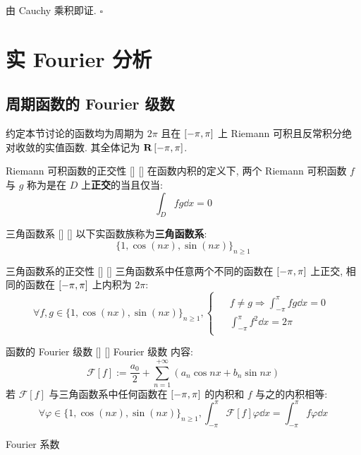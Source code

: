 \documentclass[UTF8]{ctexart}
\begin{document}
			\begin{prf}
				由 Cauchy 乘积即证. 
				\(\square\)
			\end{prf}

	\section{实 Fourier 分析}

		\subsection{周期函数的 Fourier 级数}

			约定本节讨论的函数均为周期为 \(2\pi\) 且在 \(\Icc{-\pi}{\pi}\) 上 Riemann 可积且反常积分绝对收敛的实值函数. 其全体记为 \(\mathbf{R}\Icc{-\pi}{\pi}\). 
			
			\begin{dfn}
			    []
			    {Riemann 可积函数的正交性}
			    []
			    []
				在函数内积的定义下, 两个 Riemann 可积函数 \(f\) 与 \(g\) 称为是在 \(D\) 上\textbf{正交}的当且仅当: 
				\[\int_D fg\dd x=0\]
			\end{dfn}

			\begin{dfn}
			    []
			    {三角函数系}
			    []
			    []
				以下实函数族称为\textbf{三角函数系}: 
				\[{\{1,\cos(nx),\sin(nx)\}}_{n\geq 1}\]
			\end{dfn}
			
			\begin{ppt}
			    []
			    {三角函数系的正交性}
			    []
			    []
				三角函数系中任意两个不同的函数在 \(\Icc{-\pi}{\pi}\) 上正交, 相同的函数在 \(\Icc{-\pi}{\pi}\) 上内积为 \(2\pi\): 
				\[\forall f,g\in{\{1,\cos(nx),\sin(nx)\}}_{n\geq 1}, 
				\begin{cases}
					\begin{aligned}
						&f\neq g \Longrightarrow\int_{-\pi}^{\pi}fg\dd x=0\\
						&\int_{-\pi}^{\pi}f^2\dd x=2\pi
					\end{aligned}
				\end{cases}\]
			\end{ppt}

			\begin{dfn}
			    []
			    {函数的 Fourier 级数}
			    []
			    []
			{}
			{Fourier 级数}
			{}
			{}
				内容: 
				\[\mathcal{F}[f]:=\frac{a_0}{2}+\sum_{n=1}^{+\infty}(a_n\cos nx+b_n\sin nx)\]
				若 \(\mathcal{F}[f]\) 与三角函数系中任何函数在 \(\Icc{-\pi}{\pi}\) 的内积和 \(f\) 与之的内积相等: 
				\[\forall\varphi\in{\{1,\cos(nx),\sin(nx)\}}_{n\geq 1}, \int_{-\pi}^{\pi}\mathcal{F}[f]\varphi\dd x=\int_{-\pi}^{\pi}f\varphi\dd x\]

			    {}
			    {Fourier 系数}
			    {}
			    {}
			\end{dfn}
\end{document}
